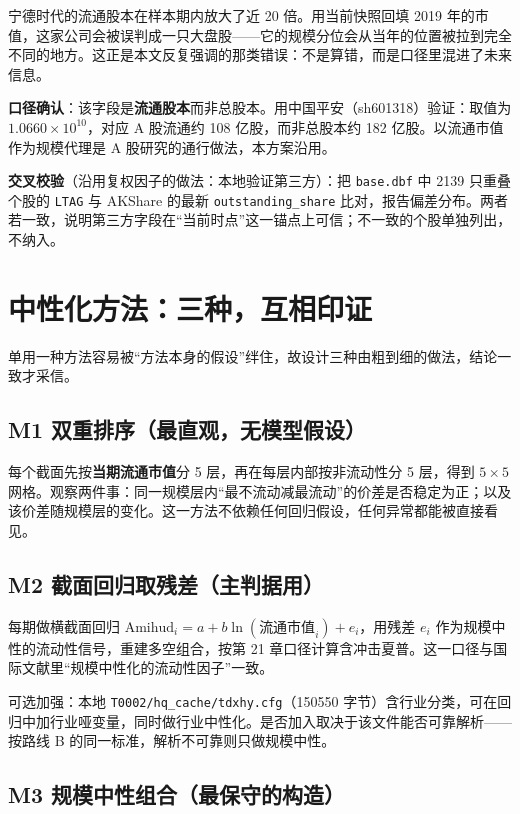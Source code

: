 \documentclass[11pt,a4paper]{ctexart}
\begin{document}
宁德时代的流通股本在样本期内放大了近 20 倍。用当前快照回填 2019 年的市值，这家公司会被误判成一只大盘股——它的规模分位会从当年的位置被拉到完全不同的地方。这正是本文反复强调的那类错误：不是算错，而是口径里混进了未来信息。

\textbf{口径确认}：该字段是\textbf{流通股本}而非总股本。用中国平安（sh601318）验证：取值为 $1.0660\times10^{10}$，对应 A 股流通约 108 亿股，而非总股本约 182 亿股。以流通市值作为规模代理是 A 股研究的通行做法，本方案沿用。

\textbf{交叉校验}（沿用复权因子的做法：本地验证第三方）：把 \texttt{base.dbf} 中 2139 只重叠个股的 \texttt{LTAG} 与 AKShare 的最新 \texttt{outstanding\_share} 比对，报告偏差分布。两者若一致，说明第三方字段在“当前时点”这一锚点上可信；不一致的个股单独列出，不纳入。

\section{中性化方法：三种，互相印证}

单用一种方法容易被“方法本身的假设”绊住，故设计三种由粗到细的做法，结论一致才采信。

\subsection{M1 双重排序（最直观，无模型假设）}

每个截面先按\textbf{当期流通市值}分 5 层，再在每层内部按非流动性分 5 层，得到 $5\times5$ 网格。观察两件事：同一规模层内“最不流动减最流动”的价差是否稳定为正；以及该价差随规模层的变化。这一方法不依赖任何回归假设，任何异常都能被直接看见。

\subsection{M2 截面回归取残差（主判据用）}

每期做横截面回归 $\text{Amihud}_i = a + b\ln(\text{流通市值}_i) + e_i$，用残差 $e_i$ 作为规模中性的流动性信号，重建多空组合，按第 21 章口径计算含冲击夏普。这一口径与国际文献里“规模中性化的流动性因子”一致。

可选加强：本地 \texttt{T0002/hq\_cache/tdxhy.cfg}（150550 字节）含行业分类，可在回归中加行业哑变量，同时做行业中性化。是否加入取决于该文件能否可靠解析——按路线 B 的同一标准，解析不可靠则只做规模中性。

\subsection{M3 规模中性组合（最保守的构造）}
\end{document}
